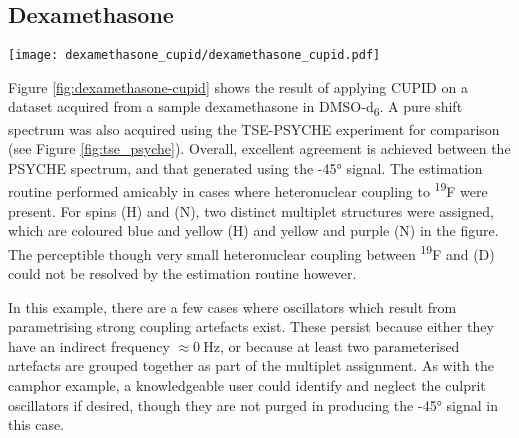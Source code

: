 \subsection{Dexamethasone}
\begin{sidewaysfigure}%
    \centering%
    \texttt{[image: dexamethasone\_cupid/dexamethasone\_cupid.pdf]}%
    \caption[
        Application of \acs{CUPID} on a dexamethasone dataset.
    ]{
        Application of \acs{CUPID} on a \ac{2DJ} dataset of dexamethasone in
        \ac{DMSO}-d\textsubscript{6}.
        \textbf{a.} \acs{TSE-PSYCHE} spectrum of the sample.
        \textbf{b.} The spectrum generated from \ac{FT} of the \ang{-45}
        signal.
        \textbf{c.} Conventional \acs{1D} spectrum.
        \textbf{d.} Multiplet structures assigned ($\epsilon =
        \nicefrac{\fswtwo}{\Ntwo} \approx \qty{0.92}{\hertz}$).
        \textbf{e.} Magnitude-mode \acs{2DJ} spectrum, with the locations of
        assigned oscillators given as coloured points.
    }
    \label{fig:dexamethasone-cupid}%
\end{sidewaysfigure}%

Figure \ref{fig:dexamethasone-cupid} shows the result of applying CUPID on a
dataset acquired from a sample dexamethasone in DMSO-d\textsubscript{6}. A
pure shift spectrum was also acquired using the
\ac{TSE-PSYCHE} experiment\cite{Foroozandeh2018,Foroozandeh2015} for
comparison (see Figure \ref{fig:tse_psyche}). Overall, excellent agreement is
achieved between the \ac{PSYCHE}
spectrum, and that generated using the \ang{-45} signal. The estimation routine
performed amicably in cases where heteronuclear coupling to
\textsuperscript{19}F were present. For spins (H) and (N), two distinct
multiplet structures were assigned, which are coloured blue and yellow (H) and
yellow and purple (N) in the figure. The perceptible though very small
heteronuclear coupling between \textsuperscript{19}F and (D) could not be
resolved by the estimation routine however.

In this example, there are a few cases where oscillators which result from
parametrising strong coupling artefacts exist. These persist because
either they have an indirect frequency $\approx \qty{0}{\hertz}$, or because at
least two parameterised artefacts are grouped together as part of the multiplet
assignment. As with the camphor example, a knowledgeable user could identify
and neglect the culprit oscillators if desired, though they are not purged in
producing the \ang{-45} signal in this case.


